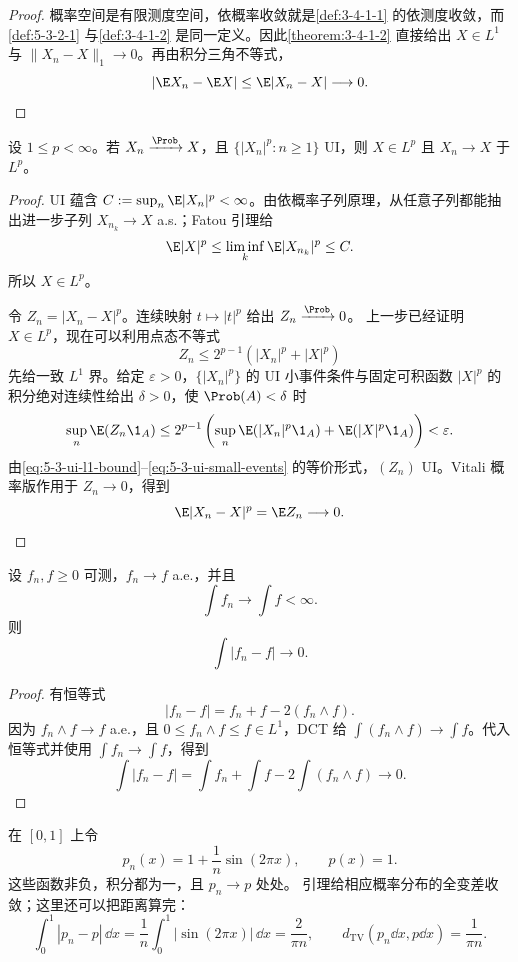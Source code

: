 \begin{proof}
概率空间是有限测度空间，依概率收敛就是\cref{def:3-4-1-1} 的依测度收敛，而
\cref{def:5-3-2-1} 与\cref{def:3-4-1-2} 是同一定义。因此\cref{theorem:3-4-1-2} 直接给出 $X\in L^1$ 与
$\|X_n-X\|_1\to0$。再由积分三角不等式，
\[
 |\E X_n-\E X|\le\E|X_n-X|\longrightarrow0.
\]
\end{proof}

\begin{proposition}[$L^p$ 升级]\label{proposition:5-3-2-2}
设 $1\le p<\infty$。若 $X_n\xrightarrow{\Prob}X$，且
$\{|X_n|^p:n\ge1\}$ UI，则 $X\in L^p$ 且 $X_n\to X$ 于 $L^p$。
\end{proposition}

\begin{proof}
UI 蕴含 $C:=\sup_n\E|X_n|^p<\infty$。由依概率子列原理，从任意子列都能抽出进一步子列
$X_{n_k}\to X$ a.s.；Fatou 引理给
\[
 \E|X|^p\le\liminf_k\E|X_{n_k}|^p\le C.
\]
所以 $X\in L^p$。

令 $Z_n=|X_n-X|^p$。连续映射 $t\mapsto|t|^p$ 给出 $Z_n\xrightarrow{\Prob}0$。
上一步已经证明 $X\in L^p$，现在可以利用点态不等式
\[
 Z_n\le2^{p-1}(|X_n|^p+|X|^p)
\]
先给一致 $L^1$ 界。给定 $\varepsilon>0$，$\{|X_n|^p\}$ 的 UI 小事件条件与固定可积函数 $|X|^p$ 的积分绝对连续性给出 $\delta>0$，使 $\Prob(A)<\delta$ 时
\[
 \sup_n\E(Z_n\1_A)
 \le2^{p-1}\left(
   \sup_n\E(|X_n|^p\1_A)+\E(|X|^p\1_A)
 \right)<\varepsilon.
\]
由\eqref{eq:5-3-ui-l1-bound}--\eqref{eq:5-3-ui-small-events} 的等价形式，$(Z_n)$ UI。Vitali 概率版作用于 $Z_n\to0$，得到
\[
 \E|X_n-X|^p=\E Z_n\longrightarrow0.
\]
\end{proof}

\begin{theorem}[\Scheffe{} 引理]\label{theorem:5-3-2-3}
设 $f_n,f\ge0$ 可测，$f_n\to f$ a.e.，并且
\[
 \int f_n\longrightarrow\int f<\infty.
\]
则
\[
 \int|f_n-f|\longrightarrow0.
\]
\end{theorem}

\begin{proof}
有恒等式
\[
 |f_n-f|=f_n+f-2(f_n\wedge f).
\]
因为 $f_n\wedge f\to f$ a.e.，且 $0\le f_n\wedge f\le f\in L^1$，DCT 给
$\int(f_n\wedge f)\to\int f$。代入恒等式并使用 $\int f_n\to\int f$，得到
\[
 \int|f_n-f|
 =\int f_n+\int f-2\int(f_n\wedge f)\longrightarrow0.
\]
\end{proof}

\begin{example}[密度与全变差的直接计算]\label{ex:5-3-2-3}
在 $[0,1]$ 上令
\[
 p_n(x)=1+\frac1n\sin(2\pi x),\qquad p(x)=1.
\]
这些函数非负，积分都为一，且 $p_n\to p$ 处处。\Scheffe{} 引理给相应概率分布的全变差收敛；这里还可以把距离算完：
\[
 \int_0^1|p_n-p|\,\dd x
 =\frac1n\int_0^1|\sin(2\pi x)|\,\dd x
 =\frac{2}{\pi n},
 \qquad
 d_{\mathrm{TV}}(p_n\dd x,p\dd x)=\frac1{\pi n}.
\]
\end{example}

